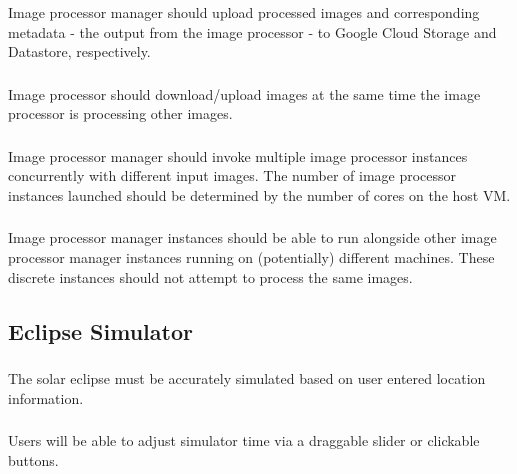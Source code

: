 \documentclass[10pt, onecolumn, draftclsnofoot, letterpaper, compsoc]{IEEEtran}
\begin{document}
    \subsubsection{} 
    Image processor manager should upload processed images and corresponding metadata 
    - the output from the image processor - to Google Cloud Storage and Datastore, respectively. \\

    \subsubsection{} 
    Image processor should download/upload images at the same time the image processor 
    is processing other images. \\

    \subsubsection{} 
    Image processor manager should invoke multiple image processor instances concurrently 
    with different input images. The number of image processor instances launched should be 
    determined by the number of cores on the host VM. \\

    \subsubsection{} 
    Image processor manager instances should be able to run alongside other image processor 
    manager instances running on (potentially) different machines. These discrete instances should 
    not attempt to process the same images. \\

\subsection{Eclipse Simulator}
    \subsubsection{}
    The solar eclipse must be accurately simulated based on
    user entered location information. \\
    
    \subsubsection{}
    Users will be able to adjust simulator time via a
    draggable slider or clickable buttons. \\
    
\end{document}
